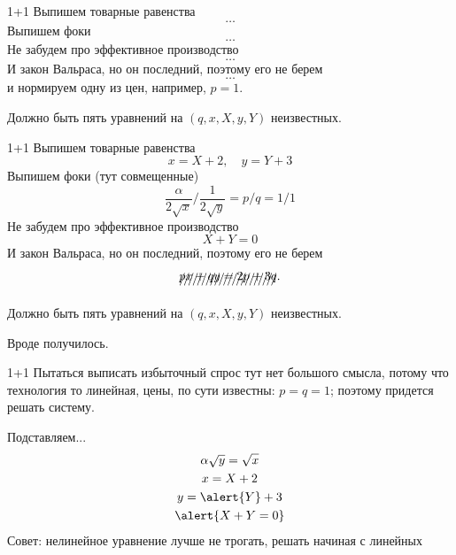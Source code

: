 \documentclass{beamer}
\begin{document}
\begin{frame}{1+1}
Выпишем товарные равенства
$$ \ldots $$
Выпишем фоки 
$$ \ldots $$
Не забудем про эффективное производство
$$  \ldots $$
И закон Вальраса, но он последний, поэтому его не берем
$$ \ldots $$
и нормируем одну из цен, например, $p = 1$.

Должно быть пять уравнений на $(q,x,X,y,Y)$ неизвестных.
\end{frame}

\begin{frame}{1+1}
Выпишем товарные равенства
$$x = X + 2, \quad y = Y + 3$$
Выпишем фоки (тут совмещенные)
$$\frac{\alpha}{2\sqrt{x}} / \frac{1}{2\sqrt{y}} = p/q = 1/1$$
Не забудем про эффективное производство
$$ X + Y = 0$$
И закон Вальраса, но он последний, поэтому его не берем
$$ \xout{p x + q y = 2 p + 3 q}.$$

Должно быть пять уравнений на $(q,x,X,y,Y)$ неизвестных.

Вроде получилось.
\end{frame}

\begin{frame}{1+1}
Пытаться \alert{выписать избыточный спрос тут нет большого смысла}, потому что технология то линейная, \alert{цены, по сути известны}: $p=q=1$; поэтому придется решать систему.

Подставляем...
\begin{gather*}
\alpha \sqrt{y} = \sqrt{x}\\
x = X+ 2\\
y = \alert{Y} + 3\\
\alert{X+Y = 0}	
\end{gather*}
Совет: нелинейное уравнение лучше не трогать, решать начиная с линейных
\end{frame}
%
%
%
%
%
\end{document}
